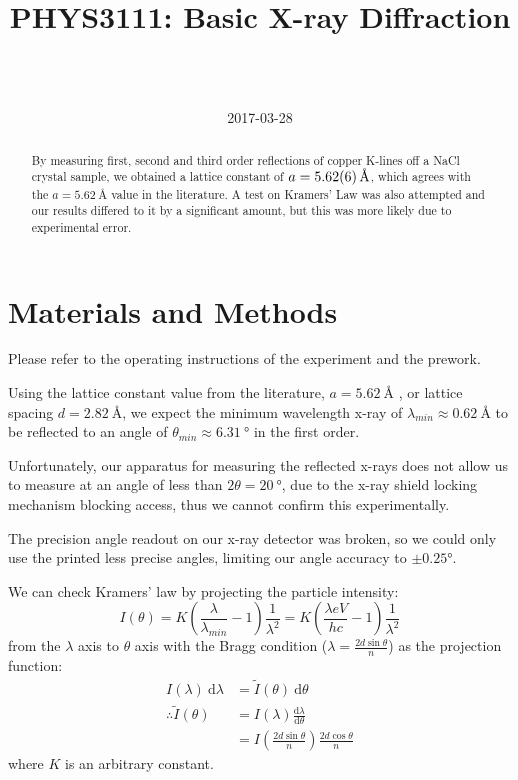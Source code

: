 \documentclass[a4paper]{scrartcl}
\begin{document}
\title{PHYS3111: Basic X-ray Diffraction}
\author{ \\ \\ }
\date{2017-03-28}
\maketitle

\begin{abstract}
    By measuring first, second and third order reflections of copper K-lines off a NaCl crystal sample, we obtained a lattice constant of \(a = \SI{5.62 \pm 0.06}{\angstrom}\), which agrees with the \(a = \SI{5.62}{\angstrom}\) value in the literature\cite{Mott1940}. A test on Kramers' Law was also attempted and our results differed to it by a significant amount, but this was more likely due to experimental error.
\end{abstract}

\section{Materials and Methods}
Please refer to the operating instructions of the experiment and the prework.

Using the lattice constant value from the literature, \(a = \SI{5.62}{\angstrom}\) \cite{Mott1940}, or lattice spacing \(d = \SI{2.82}{\angstrom}\), we expect the minimum wavelength x-ray of \(\lambda_{min} \approx \SI{0.62}{\angstrom}\) to be reflected to an angle of \(\theta_{min} \approx \SI{6.31}{\degree}\) in the first order.

Unfortunately, our apparatus for measuring the reflected x-rays does not allow us to measure at an angle of less than \(2 \theta = \SI{20}{\degree}\), due to the x-ray shield locking mechanism blocking access, thus we cannot confirm this experimentally.

The precision angle readout on our x-ray detector was broken, so we could only use the printed less precise angles, limiting our angle accuracy to \(\pm 0.25 \si{\degree}\).

We can check Kramers' law by projecting the particle intensity:
\[I(\theta) = K \left(\frac{\lambda}{\lambda_{min}} - 1\right) \frac{1}{\lambda^2} = K \left(\frac{\lambda e V}{h c} - 1\right) \frac{1}{\lambda^2}\]
from the \(\lambda\) axis to \(\theta\) axis with the Bragg condition (\(\lambda = \frac{2 d \sin \theta}{n}\)) as the projection function:
\begin{align*}
    I(\lambda) \:\mathrm{d}\lambda &= \tilde I(\theta) \:\mathrm{d}\theta \\
    \therefore \tilde I(\theta) &= I(\lambda) \frac{\mathrm{d}\lambda}{\mathrm{d}\theta} \\
    &= I\left(\frac{2 d \sin \theta}{n}\right) \frac{2 d \cos \theta}{n}
\end{align*}
where \(K\) is an arbitrary constant.
\end{document}
